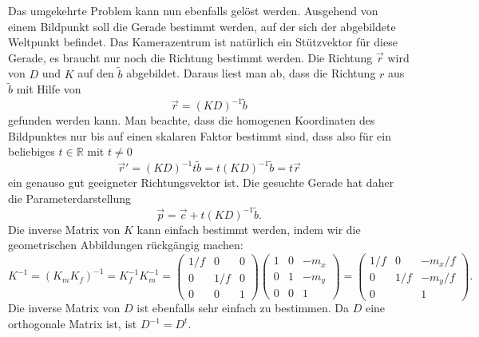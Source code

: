 Das umgekehrte Problem kann nun ebenfalls gelöst werden.
Ausgehend von einem Bildpunkt soll die Gerade bestimmt werden, auf der
sich der abgebildete Weltpunkt befindet.
Das Kamerazentrum ist natürlich ein Stützvektor für diese Gerade, es
braucht nur noch die Richtung bestimmt werden.
Die Richtung $\vec{r}$ wird von $D$ und $K$ auf den $\tilde b$ abgebildet.
Daraus liest man ab, dass die Richtung $r$ aus $\tilde b$
mit Hilfe von
\[
\vec{r} = (KD)^{-1} \tilde b
\]
gefunden werden kann.
Man beachte, dass die homogenen Koordinaten des Bildpunktes nur bis auf
einen skalaren Faktor bestimmt sind, dass also für ein beliebiges
$t\in\mathbb R$ mit $t\ne 0$ 
\[
\vec{r}' = (KD)^{-1} t\tilde b = t (KD)^{-1} \tilde b=t\vec{r}
\]
ein genauso gut geeigneter Richtungsvektor ist.
Die gesuchte Gerade hat daher die Parameterdarstellung
\[
\vec{p} = \vec{c} + t (KD)^{-1}\tilde b.
\]
Die inverse Matrix von $K$ kann einfach bestimmt werden, indem wir die
geometrischen Abbildungen rückgängig machen:
\[
K^{-1}
=
(K_mK_f)^{-1}
=
K_f^{-1}K_m^{-1}
=
\begin{pmatrix}
1/f& 0 & 0\\
0  &1/f& 0\\
0  & 0 & 1
\end{pmatrix}
\begin{pmatrix}
1&0&-m_x\\
0&1&-m_y\\
0&0&1
\end{pmatrix}
=
\begin{pmatrix}
1/f& 0 & -m_x/f\\
 0 &1/f& -m_y/f\\
 0 &   &  1
\end{pmatrix}.
\]
Die inverse Matrix von $D$ ist ebenfalls sehr einfach zu bestimmen.
Da $D$ eine orthogonale Matrix ist, ist $D^{-1}=D^t$.


